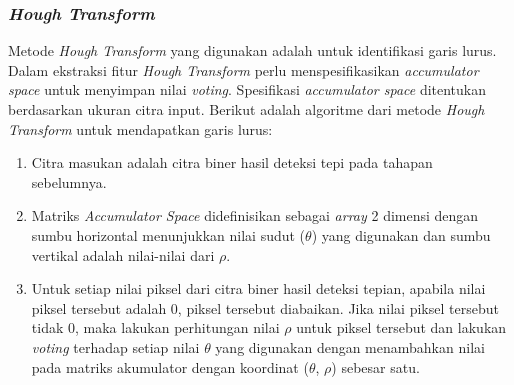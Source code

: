 \subsubsection{\textit{Hough Transform}}
\noindent Metode \textit{Hough Transform} yang digunakan adalah untuk identifikasi garis lurus. Dalam ekstraksi fitur \textit{Hough Transform} perlu menspesifikasikan \textit{accumulator space} untuk menyimpan nilai \textit{voting}. Spesifikasi \textit{accumulator space} ditentukan berdasarkan ukuran citra input. Berikut adalah algoritme dari metode \textit{Hough Transform} untuk mendapatkan garis lurus:
\begin{enumerate}
\item Citra masukan adalah citra biner hasil deteksi tepi pada tahapan sebelumnya.
\item Matriks \textit{Accumulator Space} didefinisikan sebagai \textit{array} 2 dimensi dengan sumbu horizontal menunjukkan nilai sudut ($\theta$) yang digunakan dan sumbu vertikal adalah nilai-nilai dari $\rho$.\\
\begin{adjustbox}{width=1\textwidth}
	\noindent\begin{minipage}{\linewidth}
		\centering{}
		\label{fig:MatriksAccumulatorSpace}
	\end{minipage}
\end{adjustbox}
\item Untuk setiap nilai piksel dari citra biner hasil deteksi tepian, apabila nilai piksel tersebut adalah 0, piksel tersebut diabaikan. Jika nilai piksel tersebut tidak 0, maka lakukan perhitungan nilai $\rho$ untuk piksel tersebut dan lakukan \textit{voting} terhadap setiap nilai $\theta$ yang digunakan dengan menambahkan nilai pada matriks akumulator dengan koordinat ($\theta$, $\rho$) sebesar satu.

\end{enumerate}
